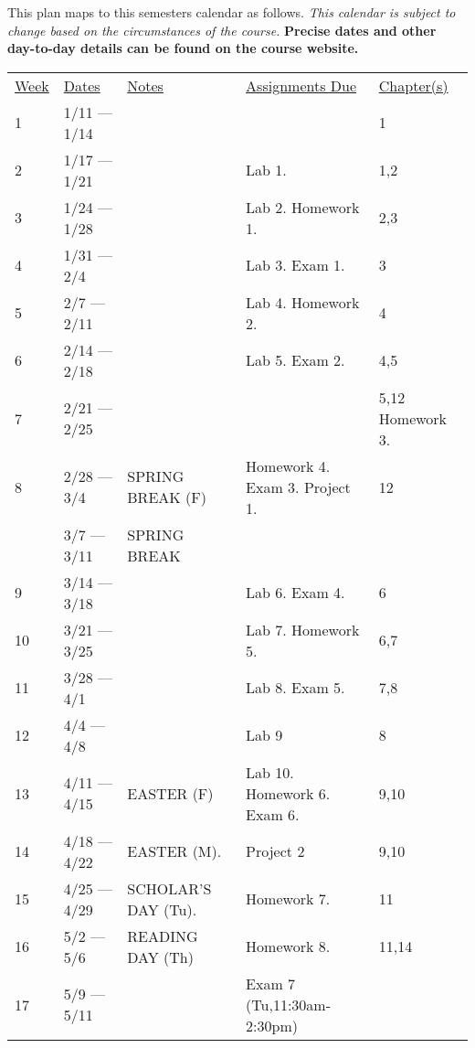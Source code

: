 \documentclass[10pt]{article}
\begin{document}
This plan maps to this semesters calendar as follows. \textit{This calendar is subject to change based on the circumstances of the course.} \textbf{Precise dates and other day-to-day details can be found on the course website.}

\begin{center}
\begin{tabular}{lllll}
\underline{Week} & \underline{Dates} & \underline{Notes} & \underline{Assignments Due} & \underline{Chapter(s)}\\
1 & 1/11 --- 1/14 & &  & 1  \\
2 & 1/17 --- 1/21 &  & Lab 1. & 1,2 \\
3 & 1/24 --- 1/28 & & Lab 2. Homework 1. & 2,3 \\
4 & 1/31 --- 2/4 & &  Lab 3. Exam 1. & 3 \\
5 & 2/7 --- 2/11 & &  Lab 4. Homework 2. & 4\\
6 & 2/14 --- 2/18 & & Lab 5. Exam 2.  & 4,5 \\
7 & 2/21 --- 2/25 & & & 5,12 Homework 3.\\
8 & 2/28 --- 3/4 &  SPRING BREAK (F) &  Homework 4. Exam 3. Project 1. & 12 \\
& 3/7 --- 3/11 &  SPRING BREAK & \\
9 & 3/14 --- 3/18 & & Lab 6. Exam 4. & 6\\
10 & 3/21 --- 3/25 & & Lab 7. Homework 5. & 6,7\\
11 & 3/28 --- 4/1 & & Lab 8. Exam 5. & 7,8\\
12 & 4/4 --- 4/8 &  & Lab 9 & 8 \\
13 & 4/11 --- 4/15 & EASTER (F) & Lab 10. Homework 6. Exam 6. & 9,10 \\
14 & 4/18 --- 4/22 & EASTER (M). & Project 2 & 9,10 \\
15 & 4/25 --- 4/29 & SCHOLAR'S DAY (Tu). & Homework 7. & 11 \\
16 & 5/2 --- 5/6 & READING DAY (Th) & Homework 8. & 11,14 \\
17 & 5/9 --- 5/11 &  & Exam 7 (Tu,11:30am-2:30pm) &

\end{tabular}
\end{center}
\end{document}
